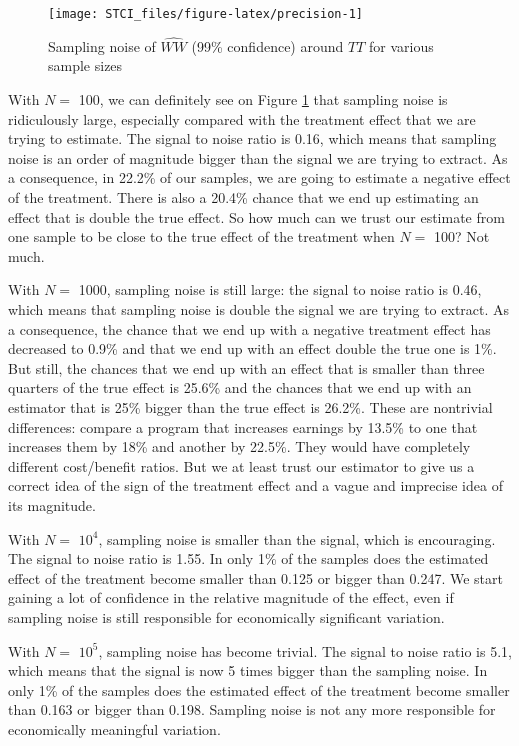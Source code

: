 \documentclass[
]{book}
\theoremstyle{definition}
\theoremstyle{definition}
\theoremstyle{definition}
\theoremstyle{definition}
\theoremstyle{remark}
\begin{document}
\begin{figure}[htbp]

{\centering \texttt{[image: STCI\_files/figure-latex/precision-1]} 

}

\caption{Sampling noise of $\hat{WW}$ (99\% confidence) around $TT$ for various sample sizes}\label{fig:precision}
\end{figure}

With \(N=\) 100, we can definitely see on Figure \ref{fig:precision} that sampling noise is ridiculously large, especially compared with the treatment effect that we are trying to estimate.
The signal to noise ratio is 0.16, which means that sampling noise is an order of magnitude bigger than the signal we are trying to extract.
As a consequence, in 22.2\% of our samples, we are going to estimate a negative effect of the treatment.
There is also a 20.4\% chance that we end up estimating an effect that is double the true effect.
So how much can we trust our estimate from one sample to be close to the true effect of the treatment when \(N=\) 100?
Not much.

With \(N=\) 1000, sampling noise is still large: the signal to noise ratio is 0.46, which means that sampling noise is double the signal we are trying to extract.
As a consequence, the chance that we end up with a negative treatment effect has decreased to 0.9\% and that we end up with an effect double the true one is 1\%.
But still, the chances that we end up with an effect that is smaller than three quarters of the true effect is 25.6\% and the chances that we end up with an estimator that is 25\% bigger than the true effect is 26.2\%.
These are nontrivial differences: compare a program that increases earnings by 13.5\% to one that increases them by 18\% and another by 22.5\%.
They would have completely different cost/benefit ratios.
But we at least trust our estimator to give us a correct idea of the sign of the treatment effect and a vague and imprecise idea of its magnitude.

With \(N=\) \ensuremath{10^{4}}, sampling noise is smaller than the signal, which is encouraging.
The signal to noise ratio is 1.55.
In only 1\% of the samples does the estimated effect of the treatment become smaller than 0.125 or bigger than 0.247.
We start gaining a lot of confidence in the relative magnitude of the effect, even if sampling noise is still responsible for economically significant variation.

With \(N=\) \ensuremath{10^{5}}, sampling noise has become trivial.
The signal to noise ratio is 5.1, which means that the signal is now 5 times bigger than the sampling noise.
In only 1\% of the samples does the estimated effect of the treatment become smaller than 0.163 or bigger than 0.198.
Sampling noise is not any more responsible for economically meaningful variation.
\end{document}

